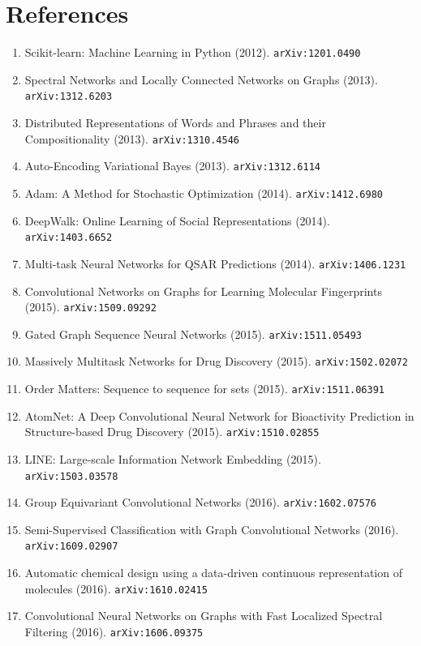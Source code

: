 \documentclass[11pt]{article}
\begin{document}
\section*{References}
\begin{enumerate}\small
  \item Scikit-learn: Machine Learning in Python (2012). \texttt{arXiv:1201.0490}
  \item Spectral Networks and Locally Connected Networks on Graphs (2013). \texttt{arXiv:1312.6203}
  \item Distributed Representations of Words and Phrases and their
  Compositionality (2013). \texttt{arXiv:1310.4546}
  \item Auto-Encoding Variational Bayes (2013). \texttt{arXiv:1312.6114}
  \item Adam: A Method for Stochastic Optimization (2014). \texttt{arXiv:1412.6980}
  \item DeepWalk: Online Learning of Social Representations (2014). \texttt{arXiv:1403.6652}
  \item Multi-task Neural Networks for QSAR Predictions (2014). \texttt{arXiv:1406.1231}
  \item Convolutional Networks on Graphs for Learning Molecular Fingerprints (2015). \texttt{arXiv:1509.09292}
  \item Gated Graph Sequence Neural Networks (2015). \texttt{arXiv:1511.05493}
  \item Massively Multitask Networks for Drug Discovery (2015). \texttt{arXiv:1502.02072}
  \item Order Matters: Sequence to sequence for sets (2015). \texttt{arXiv:1511.06391}
  \item AtomNet: A Deep Convolutional Neural Network for Bioactivity Prediction
  in Structure-based Drug Discovery (2015). \texttt{arXiv:1510.02855}
  \item LINE: Large-scale Information Network Embedding (2015). \texttt{arXiv:1503.03578}
  \item Group Equivariant Convolutional Networks (2016). \texttt{arXiv:1602.07576}
  \item Semi-Supervised Classification with Graph Convolutional Networks (2016). \texttt{arXiv:1609.02907}
  \item Automatic chemical design using a data-driven continuous representation
  of molecules (2016). \texttt{arXiv:1610.02415}
  \item Convolutional Neural Networks on Graphs with Fast Localized Spectral
  Filtering (2016). \texttt{arXiv:1606.09375}

\end{enumerate}
\end{document}
